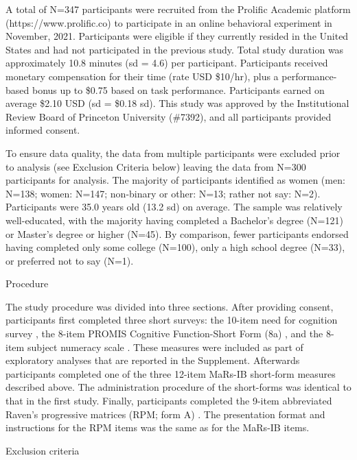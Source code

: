 \documentclass[a4paper,man,natbib]{apa6}
\makeatletter
\renewcommand{\subsubsection}{\@startsection{subsubsection}{3}
  {\z@}%
  {\b@level@two@skip}{\e@level@two@skip}%
  {\normalfont\normalsize\bfseries}}
\makeatother
\begin{document}
A total of N=347 participants were recruited from the Prolific Academic platform (https://www.prolific.co) to participate in an online behavioral experiment in November, 2021. Participants were eligible if they currently resided in the United States and had not participated in the previous study. Total study duration was approximately 10.8 minutes (sd = 4.6) per participant. Participants received monetary compensation for their time (rate USD \$10/hr), plus a performance-based bonus up to \$0.75 based on task performance. Participants earned on average \$2.10 USD (sd = \$0.18 sd). This study was approved by the Institutional Review Board of Princeton University (\#7392), and all participants provided informed consent. 

To ensure data quality, the data from multiple participants were excluded prior to analysis (see Exclusion Criteria below) leaving the data from N=300 participants for analysis. The majority of participants identified as women (men: N=138; women: N=147; non-binary or other: N=13; rather not say: N=2). Participants were 35.0 years old (13.2 sd) on average. The sample was relatively well-educated, with the majority having completed a Bachelor's degree (N=121) or Master's degree or higher (N=45). By comparison, fewer participants endorsed having completed only some college (N=100), only a high school degree (N=33), or preferred not to say (N=1). 

\subsubsection{Procedure}

The study procedure was divided into three sections. After providing consent, participants first completed three short surveys: the 10-item need for cognition survey \citep{chiesi2018applying}, the 8-item PROMIS Cognitive Function-Short Form (8a) \citep{iverson2021normative}, and the 8-item subject numeracy scale \citep{fagerlin2007measuring}. These measures were included as part of exploratory analyses that are reported in the Supplement. Afterwards participants completed one of the three 12-item MaRs-IB short-form measures described above. The administration procedure of the short-forms was identical to that in the first study. Finally, participants completed the 9-item abbreviated Raven's progressive matrices (RPM; form A) \citep{bilker2012development}. The presentation format and instructions for the RPM items was the same as for the MaRs-IB items.

\subsubsection{Exclusion criteria}
\end{document}
